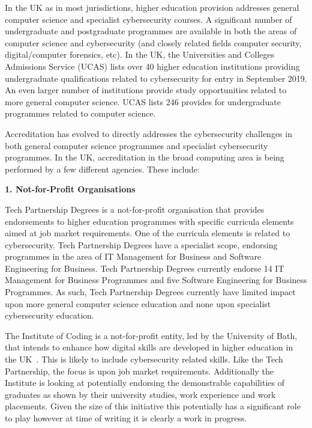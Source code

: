 \documentclass[conference]{IEEEtran}
\begin{document}
In the UK as in most jurisdictions, higher education provision addresses general computer science and specialist cybersecurity courses. A significant number of undergraduate and postgraduate programmes are available in both the areas of computer science and cybersecurity (and closely related fields computer security, digital/computer forensics, etc). In the UK, the Universities and Colleges Admissions Service (UCAS) lists over 40 higher education institutions providing undergraduate qualifications related to cybersecurity for entry in September 2019. An even larger number of institutions provide study opportunities related to more general computer science. UCAS lists 246 provides for undergraduate programmes related to computer science. 

Accreditation has evolved to directly addresses the cybersecurity challenges in both general computer science programmes and specialist cybersecurity programmes. In the UK, accreditation in the broad computing area is being performed by a few different agencies. These include:

\textbf{1. Not-for-Profit Organisations}

Tech Partnership Degrees is a not-for-profit organisation that provides endorsements to higher education programmes with specific curricula elements aimed at job market requirements. One of the curricula elements is related to cybersecurity. Tech Partnership Degrees have a specialist scope, endorsing programmes in the area of IT Management for Business and Software Engineering for Business. Tech Partnership Degrees currently endorse 14 IT Management for Business Programmes and five Software Engineering for Business Programmes. As such, Tech Partnership Degrees currently have limited impact upon more general computer science education and none upon specialist cybersecurity education. 

The Institute of Coding is a not-for-profit entity, led by the University of Bath, that intends to enhance how digital skills are developed in higher education in the UK~\cite{Davenportetal2019a}. This is likely to include cybersecurity related skills. Like the Tech Partnership, the focus is upon job market requirements. Additionally the Institute is looking at potentially endorsing the demonstrable capabilities of graduates as shown by their university studies, work experience and work placements. Given the size of this initiative this potentially has a significant role to play however at time of writing it is clearly a work in progress.
\end{document}

